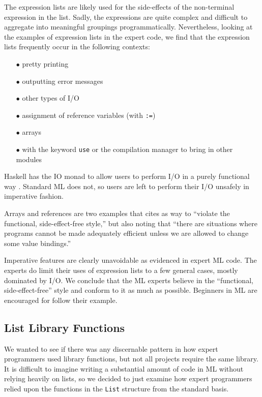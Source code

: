 \documentclass[12pt,abstracton]{scrartcl}
\begin{document}
The expression lists are likely used for the side-effects of the non-terminal
expression in the list. Sadly, the expressions are quite complex and difficult
to aggregate into meaningful groupings programmatically. Nevertheless,
looking at the examples of expression lists in the expert code, we find that
the expression lists frequently occur in the following contexts:
\begin{itemize}
\item[$\bullet$] pretty printing
\item[$\bullet$] outputting error messages
\item[$\bullet$] other types of I/O
\item[$\bullet$] assignment of reference variables (with \texttt{:=})
\item[$\bullet$] arrays
\item[$\bullet$] with the keyword \texttt{use} or the compilation manager to bring in other modules
\end{itemize}

Haskell has the IO monad to allow users to perform I/O in a purely functional way \cite{Jon93}.
Standard ML does not, so users are left to perform their
I/O unsafely in imperative fashion.

Arrays and references are two examples that \cite{Ull98} cites as way to ``violate the functional,
side-effect-free style,'' but also noting that ``there are situations where programs cannot
be made adequately efficient unless we are allowed to change some value bindings.''

Imperative features are clearly unavoidable as evidenced in expert ML code. The experts do
limit their uses of expression lists to a few general cases, mostly dominated by I/O.
We conclude that the ML experts believe in the ``functional, side-effect-free'' style
and conform to it as much as possible. Beginners in ML are encouraged for follow their example.
\subsection{List Library Functions}\label{subsec:list}
We wanted to see if there was any discernable pattern in how expert programmers
used library functions, but not all projects require the same library.
It is difficult to imagine writing a substantial amount of code in ML without
relying heavily on lists, so we decided to just examine how expert programmers relied upon the functions
in the \texttt{List} structure from the standard basis.
\end{document}
